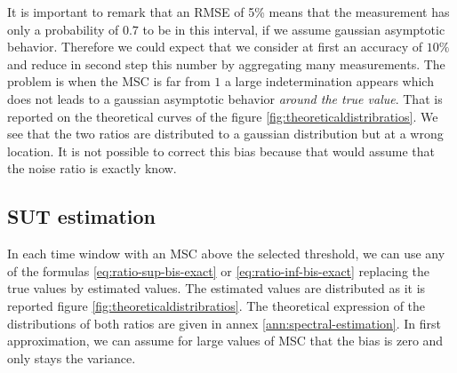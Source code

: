 

  \newpage
 It is important to remark that an RMSE of 5\% means that the measurement has only a probability of $0.7$ to be in this interval, if we assume gaussian asymptotic behavior. Therefore we could expect that we consider at first an accuracy of $10\%$ and reduce in second step this number by aggregating many measurements. The problem is when the MSC is far from $1$ a large indetermination appears which does not leads to a gaussian asymptotic behavior \emph{around the true value}. That is reported on the theoretical curves of the figure \ref{fig:theoreticaldistribratios}. We see that the two ratios are distributed to a gaussian distribution but at a wrong location. It is not possible to correct this bias because that would assume that  the noise ratio is exactly know.




\subsection{SUT estimation}
In each time window with an MSC above the selected threshold, we can use any of the formulas \eqref{eq:ratio-sup-bis-exact} or  \eqref{eq:ratio-inf-bis-exact} replacing the true values by estimated values. The estimated values are distributed as it is reported figure \ref{fig:theoreticaldistribratios}.  The theoretical expression of the distributions of both ratios are given in annex \ref{ann:spectral-estimation}. In first approximation, we can assume for large values of MSC that the bias is zero and only stays the variance.

